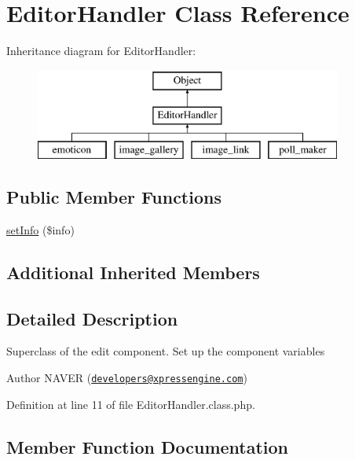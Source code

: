 \hypertarget{classEditorHandler}{}\section{Editor\+Handler Class Reference}
\label{classEditorHandler}
Inheritance diagram for Editor\+Handler\+:\begin{figure}[H]
\begin{center}
\leavevmode
\includegraphics[height=3.000000cm]{classEditorHandler}
\end{center}
\end{figure}
\subsection*{Public Member Functions}
\begin{DoxyCompactItemize}
\item 
\hyperlink{classEditorHandler_af44daebb94e0ce9ca6ff5a792fb52023}{set\+Info} (\$info)
\end{DoxyCompactItemize}
\subsection*{Additional Inherited Members}


\subsection{Detailed Description}
Superclass of the edit component. Set up the component variables

\begin{DoxyAuthor}{Author}
N\+A\+V\+ER (\href{mailto:developers@xpressengine.com}{\tt developers@xpressengine.\+com}) 
\end{DoxyAuthor}


Definition at line 11 of file Editor\+Handler.\+class.\+php.



\subsection{Member Function Documentation}
